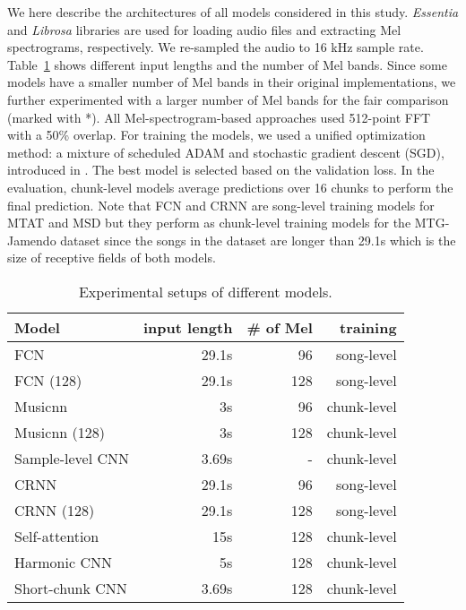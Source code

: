 \documentclass{article}
\begin{document}
We here describe the architectures of all models considered in this study. \textit{Essentia} \cite{bogdanov2013essentia} and \textit{Librosa} \cite{mcfee2015librosa} libraries are used for loading audio files and extracting Mel spectrograms, respectively. We re-sampled the audio to 16 kHz sample rate. 
Table~\ref{tab:rep} shows different input lengths and the number of Mel bands. 
Since some models have a smaller number of Mel bands in their original implementations, we further experimented with a larger number of Mel bands for the fair comparison (marked with \mbox{*}).
All Mel-spectrogram-based approaches used 512-point FFT with a 50\% overlap.
For training the models, we used a unified optimization method: a mixture of scheduled ADAM \cite{kingma2014adam} and stochastic gradient descent (SGD), introduced in \cite{won2019toward}. The best model is selected based on the validation loss. In the evaluation, chunk-level models average predictions over 16 chunks to perform the final prediction. Note that FCN and CRNN are song-level training models for MTAT and MSD but they perform as chunk-level training models for the MTG-Jamendo dataset since the songs in the dataset are longer than 29.1s which is the size of receptive fields of both models.




\begin{table}[t!]
\centering
\footnotesize
\begin{tabular}{@{}l@{}r@{\hskip 0.1in}r@{\hskip 0.1in}r@{}}
\toprule
Model &input length &\# of Mel &training\\ \midrule
FCN &29.1s  &96 &song-level\\
FCN (128) &29.1s  &128 &song-level\\
Musicnn &3s &96 &chunk-level\\
Musicnn (128) &3s &128 &chunk-level\\
Sample-level CNN&3.69s  &-  &chunk-level\\
CRNN    &29.1s  &96 &song-level\\
CRNN (128)    &29.1s  &128 &song-level\\
Self-attention  &15s    &128  &chunk-level\\
Harmonic CNN    &5s &128  &chunk-level\\
Short-chunk CNN&3.69s    &128  &chunk-level\\ \bottomrule
\end{tabular}
\caption{Experimental setups of different models.}
\label{tab:rep}
\end{table}
\end{document}
